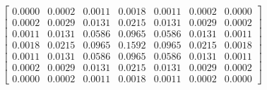 \documentclass[preview]{standalone}
\begin{document}
\begin{align*}
\begin{bmatrix}0.0000 & 0.0002 & 0.0011 & 0.0018 & 0.0011 & 0.0002 & 0.0000 \\ 0.0002 & 0.0029 & 0.0131 & 0.0215 & 0.0131 & 0.0029 & 0.0002 \\ 0.0011 & 0.0131 & 0.0586 & 0.0965 & 0.0586 & 0.0131 & 0.0011 \\ 0.0018 & 0.0215 & 0.0965 & 0.1592 & 0.0965 & 0.0215 & 0.0018 \\ 0.0011 & 0.0131 & 0.0586 & 0.0965 & 0.0586 & 0.0131 & 0.0011 \\ 0.0002 & 0.0029 & 0.0131 & 0.0215 & 0.0131 & 0.0029 & 0.0002 \\ 0.0000 & 0.0002 & 0.0011 & 0.0018 & 0.0011 & 0.0002 & 0.0000\end{bmatrix}
\end{align*}
\end{document}
